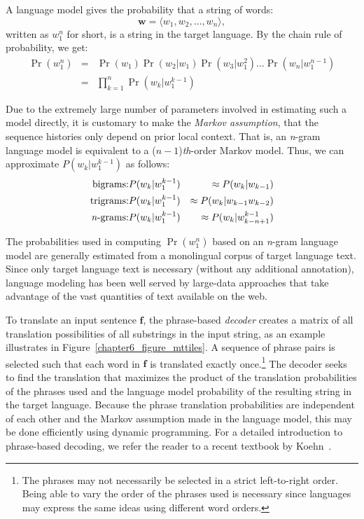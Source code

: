 A language model gives the probability that a string of words:
\begin{displaymath}
\textbf{w} = \langle w_1, w_2, \ldots , w_{n} \rangle, 
\end{displaymath}
written as
$w_{1}^{n}$ for short, is a string in the target language.  By the
chain rule of probability, we get:
\begin{eqnarray}
\Pr(w_{1}^{n}) &= & \Pr(w_1) \Pr(w_2|w_1) \Pr(w_3|w_1^2) \ldots \Pr(w_n|w_1^{n-1}) \\
              &= & \prod_{k=1}^{n} \Pr(w_k|w_1^{k-1})
\end{eqnarray}

\noindent Due to the extremely large number of parameters involved in
estimating such a model directly, it is customary to make the \emph{
  Markov assumption}, that the sequence histories only depend on prior
local context.  That is, an \emph{n}-gram language model is equivalent
to a ($n-1$)\emph{th}-order Markov model.  Thus, we can approximate
$P(w_k|w_1^{k-1})$ as follows:
\begin{eqnarray}
\textrm{bigrams:} & P(w_k|w_1^{k-1}) & \approx P(w_k|w_{k-1}) \\
\textrm{trigrams:} & P(w_k|w_1^{k-1}) & \approx P(w_k|w_{k-1} w_{k-2}) \\
\textrm{\emph{n}-grams:} & P(w_k|w_1^{k-1}) & \approx  P(w_k|w_{k-n+1}^{k-1})
\end{eqnarray}

\noindent The probabilities used in computing $\Pr(w_{1}^{n})$ based
on an \emph{n}-gram language model are generally estimated from a
monolingual corpus of target language text.  Since only target
language text is necessary (without any additional annotation),
language modeling has been well served by large-data approaches that
take advantage of the vast quantities of text available on the web.

To translate an input sentence $\textbf{f}$, the phrase-based
\emph{decoder} creates a matrix of all translation possibilities of
all substrings in the input string, as an example illustrates in
Figure~\ref{chapter6_figure_mttiles}.  A sequence of phrase pairs is
selected such that each word in $\textbf{f}$ is translated exactly
once.\footnote{The phrases may not necessarily be selected in a strict
  left-to-right order.  Being able to vary the order of the phrases
  used is necessary since languages may express the same ideas using
  different word orders.}  The decoder seeks to find the translation
that maximizes the product of the translation probabilities of the
phrases used and the language model probability of the resulting
string in the target language.  Because the phrase translation
probabilities are independent of each other and the Markov assumption
made in the language model, this may be done efficiently using dynamic
programming.  For a detailed introduction to phrase-based decoding, we
refer the reader to a recent textbook by Koehn~\cite{Koehn_2009}.

